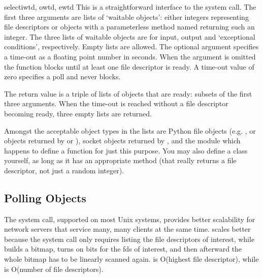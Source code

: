 \begin{funcdesc}{select}{iwtd, owtd, ewtd}
This is a straightforward interface to the \UNIX{} 
system call.  The first three arguments are lists of `waitable
objects': either integers representing \UNIX{} file descriptors or
objects with a parameterless method named  returning
such an integer.  The three lists of waitable objects are for input,
output and `exceptional conditions', respectively.  Empty lists are
allowed.  The optional  argument specifies a time-out as a
floating point number in seconds.  When the  argument
is omitted the function blocks until at least one file descriptor is
ready.  A time-out value of zero specifies a poll and never blocks.

The return value is a triple of lists of objects that are ready:
subsets of the first three arguments.  When the time-out is reached
without a file descriptor becoming ready, three empty lists are
returned.

Amongst the acceptable object types in the lists are Python file
objects (e.g. , or objects returned by
 or ), socket objects
returned by ,%
and the module  which happens to
define a function
for just this purpose.  You may
also define a  class yourself, as long as it has an
appropriate  method (that really returns a \UNIX{}
file descriptor, not just a random integer).
\end{funcdesc}

\subsection{Polling Objects
            \label{poll-objects}}

The  system call, supported on most Unix systems,
provides better scalability for network servers that service many,
many clients at the same time.
 scales better because the system call only
requires listing the file descriptors of interest, while 
builds a bitmap, turns on bits for the fds of interest, and then
afterward the whole bitmap has to be linearly scanned again.
 is O(highest file descriptor), while
 is O(number of file descriptors).

